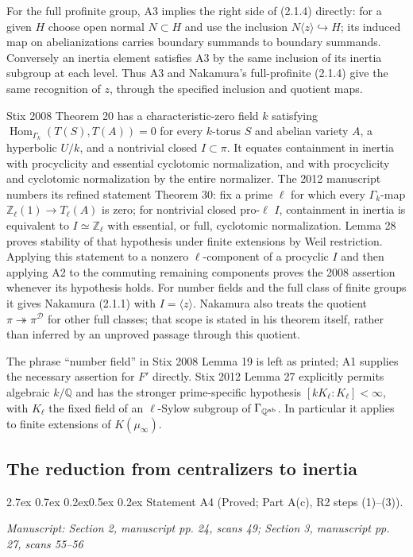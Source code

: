 \documentclass[11pt,a4paper]{article}
\makeatletter
\newcommand{\passage}[1]{\par\smallskip\noindent\textit{Manuscript: #1}\par\smallskip}
\renewcommand\paragraph{\@startsection{paragraph}{4}{\z@}%
  {2.7ex \@plus 0.7ex \@minus 0.2ex}{0.5ex \@plus 0.2ex}%
  {\normalfont\normalsize\bfseries}}
\makeatother
\begin{document}
For the full profinite group, A3 implies the right side of (2.1.4) directly: for a given $H$ choose open normal $N\subset H$ and use the inclusion $N\langle z\rangle\hookrightarrow H$; its induced map on abelianizations carries boundary summands to boundary summands. Conversely an inertia element satisfies A3 by the same inclusion of its inertia subgroup at each level. Thus A3 and Nakamura's full-profinite (2.1.4) give the same recognition of $z$, through the specified inclusion and quotient maps.

Stix 2008 Theorem 20 has a characteristic-zero field $k$ satisfying
$\operatorname{Hom}_{\Gamma_k}(T(S),T(A))=0$ for every $k$-torus $S$ and abelian variety $A$, a hyperbolic $U/k$, and a nontrivial closed $I\subset\pi$. It equates containment in inertia with procyclicity and essential cyclotomic normalization, and with procyclicity and cyclotomic normalization by the entire normalizer. The 2012 manuscript numbers its refined statement Theorem 30: fix a prime $\ell$ for which every $\Gamma_k$-map $\mathbb Z_\ell(1)\to T_\ell(A)$ is zero; for nontrivial closed pro-$\ell$ $I$, containment in inertia is equivalent to $I\simeq\mathbb Z_\ell$ with essential, or full, cyclotomic normalization. Lemma 28 proves stability of that hypothesis under finite extensions by Weil restriction. Applying this statement to a nonzero $\ell$-component of a procyclic $I$ and then applying A2 to the commuting remaining components proves the 2008 assertion whenever its hypothesis holds. For number fields and the full class of finite groups it gives Nakamura (2.1.1) with $I=\langle z\rangle$. Nakamura also treats the quotient $\pi\twoheadrightarrow\pi^{\mathcal D}$ for other full classes; that scope is stated in his theorem itself, rather than inferred by an unproved passage through this quotient.

The phrase ``number field'' in Stix 2008 Lemma 19 is left as printed; A1 supplies the necessary assertion for $F'$ directly. Stix 2012 Lemma 27 explicitly permits algebraic $k/\mathbb Q$ and has the stronger prime-specific hypothesis $[kK_\ell:K_\ell]<\infty$, with $K_\ell$ the fixed field of an $\ell$-Sylow subgroup of $\Gamma_{\mathbb Q^{\rm ab}}$. In particular it applies to finite extensions of $K(\mu_\infty)$.

\subsection{The reduction from centralizers to inertia}
\paragraph{Statement A4 (Proved; Part A(c), R2 steps (1)--(3)).}\label{res:A4}
\passage{Section 2, manuscript pp. 24, scans 49; Section 3, manuscript pp. 27, scans 55–56}
\end{document}
